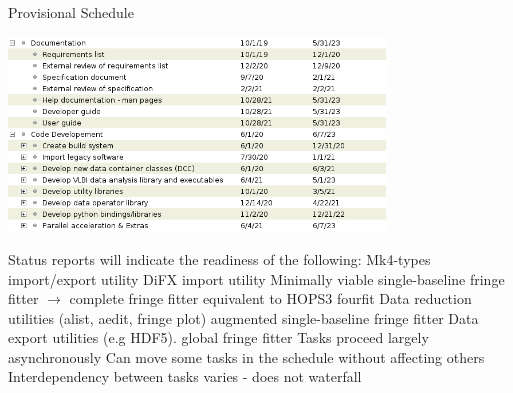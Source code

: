\documentclass[8pt]{beamer}
\begin{document}
\begin{frame}{Provisional Schedule}

    \centering
    \includegraphics[width=0.75\textwidth]{sched.png}
    \begin{outline}
    \1 Status reports will indicate the readiness of the following:
        \2 Mk4-types import/export utility
        \2 DiFX import utility
        \2 Minimally viable single-baseline fringe fitter $\rightarrow$ complete fringe fitter equivalent to HOPS3 fourfit
        \2 Data reduction utilities (alist, aedit, fringe plot)
        \2 augmented single-baseline fringe fitter 
        \2 Data export utilities (e.g HDF5).
        \2 global fringe fitter
    \1 Tasks proceed largely asynchronously
        \2 Can move some tasks in the schedule without affecting others
        \2 Interdependency between tasks varies - does not waterfall
    \end{outline}
\end{frame}
\end{document}
